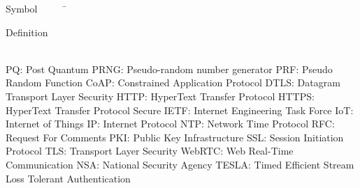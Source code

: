 
\newcommand{\comment}[1]{}
\begin{tabbing}
Symbol~~~~~\= \ \ \ \ \ \ \ \ \ \ \ \ \ \ \ \ \ \ \ \ \ \ \ \ \ \ \ \ \ \ \ \ \ \ \ \  \parbox{5in}{Definition}\\
\addsymbol \mbox{PQ}: {Post Quantum}
\addsymbol \mbox{PRNG}: {Pseudo-random number generator}
\addsymbol \mbox{PRF}: {Pseudo Random Function}
\addsymbol \mbox{CoAP}:  {Constrained Application Protocol}
\addsymbol \mbox{DTLS}:  {Datagram Transport Layer Security}
\addsymbol \mbox{HTTP}:  { HyperText Transfer Protocol}
\addsymbol \mbox{HTTPS}:  {HyperText Transfer Protocol Secure}
\addsymbol \mbox{IETF}:  {Internet Engineering Task Force}
\addsymbol \mbox{IoT}:  {Internet of Things}
\addsymbol \mbox{IP}:  {Internet Protocol}
\addsymbol \mbox{NTP}:  {Network Time Protocol}
\addsymbol \mbox{RFC}:  {Request For Comments}
\addsymbol \mbox{PKI}:  {Public Key Infrastructure}
\addsymbol \mbox{SSL}:  {Session Initiation Protocol}
\addsymbol \mbox{TLS}:  {Transport Layer Security}
\addsymbol \mbox{WebRTC}:  {Web Real-Time Communication}
\addsymbol \mbox{NSA}:  {National Security Agency}
\addsymbol \mbox{TESLA}:  {Timed Efficient Stream Loss Tolerant Authentication}




\end{tabbing}
